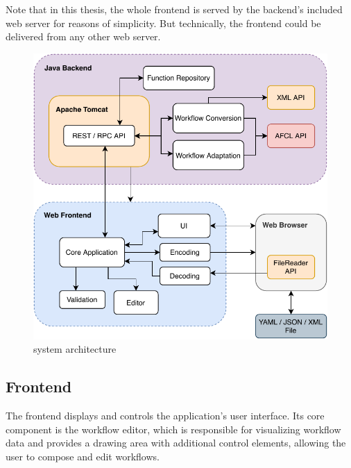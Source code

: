 \documentclass[a4paper,top=25mm,bottom=25mm,12pt,pdftex,halfparskip,twoside,bibtotoc,numbers=noenddot]{scrbook}
\begin{document}
Note that in this thesis, the whole frontend is served by the backend's included web server for reasons of simplicity. But technically, the frontend could be delivered from any other web server.


\begin{figure}[H]
  \centering
  \vspace{0.8cm}
  \includegraphics{architecture}
  \caption{system architecture}
\end{figure}

\subsection{Frontend}



The frontend displays and controls the application's user interface. Its core component is the workflow editor, which is responsible for visualizing workflow data and provides a drawing area with additional control elements, allowing the user to compose and edit workflows. 
\end{document}
